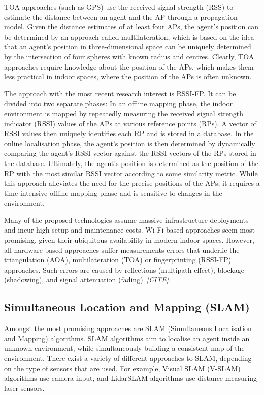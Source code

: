 \documentclass[a4paper]{article}
\begin{document}
TOA approaches (such as GPS) use the received signal strength (RSS) to
estimate the distance between an agent and the AP through a propagation model.
Given the distance estimates of at least four APs, the agent's position can be
determined by an approach called multilateration, which is based on the idea
that an agent's position in three-dimensional space can be uniquely determined
by the intersection of four spheres with known radius and centres. Clearly,
TOA approaches require knowledge about the position of the APs, which makes
them less practical in indoor spaces, where the position of the APs is often
unknown.

The approach with the most recent research interest is RSSI-FP. It can be
divided into two separate phases: In an offline mapping phase, the indoor
environment is mapped by repeatedly measuring the received signal strength
indicator (RSSI) values of the APs at various reference points (RPs). A vector
of RSSI values then uniquely identifies each RP and is stored in a database.
In the online localisation phase, the agent's position is then determined by
dynamically comparing the agent's RSSI vector against the RSSI vectors of the
RPs stored in the database. Ultimately, the agent's position is determined as
the position of the RP with the most similar RSSI vector according to some
similarity metric. While this approach alleviates the need for the precise
positions of the APs, it requires a time-intensive offline mapping phase and
is sensitive to changes in the environment.

Many of the proposed technologies assume massive infrastructure deployments
and incur high setup and maintenance costs. Wi-Fi based approaches seem most
promising, given their ubiquitous availability in modern indoor spaces.
However, all hardware-based approaches suffer measurements errors that
underlie the triangulation (AOA), multilateration (TOA) or fingerprinting
(RSSI-FP) approaches. Such errors are caused by reflections (multipath
effect), blockage (shadowing), and signal attenuation
(fading)~\textit{[CITE]}.


\subsection{Simultaneous Location and Mapping (SLAM)} %

Amongst the most promising approaches are SLAM (Simultaneous Localisation and
Mapping) algorithms. SLAM algorithms aim to localise an agent inside an
unknown environment, while simultaneously building a consistent map of the
environment. There exist a variety of different approaches to SLAM, depending
on the type of sensors that are used. For example, Visual SLAM (V-SLAM)
algorithms use camera input, and LidarSLAM algorithms use distance-measuring
laser sensors. 
\end{document}
